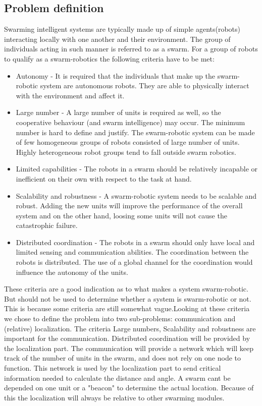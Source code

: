 \documentclass[10pt,a4paper]{article}
\begin{document}
\subsection{Problem definition}
Swarming intelligent systems are typically made up of simple agents(robots) interacting locally with one another and their environment. The group of individuals acting in such manner is referred to as a swarm\cite{swarmintelligence}. For a group of robots to qualify as a swarm-robotics the following criteria have to be met:

\begin{itemize}
	\item Autonomy - It is required that the individuals that make up 	the swarm-robotic system are autonomous robots. They are able to 		physically 		interact with the environment and affect it\cite{swarmintelligence}.
	\item Large number - A large number of units is required
	as well, so the cooperative behaviour (and
	swarm intelligence) may occur. The minimum number
	is hard to define and justify. The swarm-robotic
	system can be made of few homogeneous groups of
	robots consisted of large number of units. Highly heterogeneous
	robot groups tend to fall outside swarm
	robotics\cite{swarmintelligence}.
	\item Limited capabilities - The robots in a swarm
	should be relatively incapable or inefficient on their
	own with respect to the task at hand\cite{swarmintelligence}.
	\item Scalability and robustness - A swarm-robotic
	system needs to be scalable and robust. Adding the
	new units will improve the performance of the overall
	system and on the other hand, loosing some units will
	not cause the catastrophic failure\cite{swarmintelligence}.
	\item Distributed coordination - The robots in a swarm
	should only have local and limited sensing and communication
	abilities. The coordination between the
	robots is distributed. The use of a global channel for
	the coordination would influence the autonomy of the
	units\cite{swarmintelligence}.
\end{itemize}

These criteria are a good indication as to what makes a system swarm-robotic. But should not be used to determine whether a system is swarm-robotic or not. This is because some criteria are still somewhat vague\cite{swarmintelligence}.Looking at these criteria we chose to define the problem into two sub-problems: communication and (relative) localization.
The criteria Large numbers, Scalability and robustness are important for the communication. Distributed coordination will be provided by the localization part. The communication will provide a network which will keep track of the number of units in the swarm, and does not rely on one node to function. This network is used by the localization part to send critical information needed to calculate the distance and angle. A swarm cant be depended on one unit or a "beacon" to determine the actual location. Because of this the localization will always be relative to other swarming modules.
\end{document}
